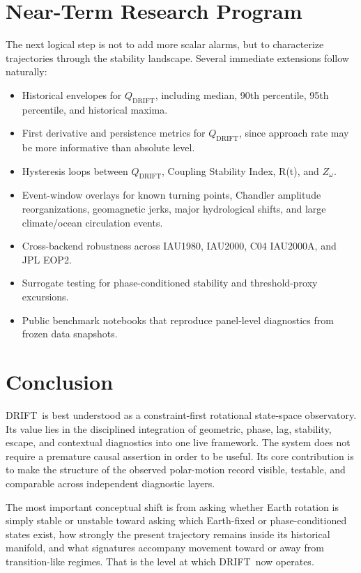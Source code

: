 \documentclass[11pt]{article}
\newcommand{\DRIFT}{\textsc{DRIFT}}
\newcommand{\Rratio}{R(t)}
\newcommand{\Qdrift}{Q_{\mathrm{DRIFT}}}
\newcommand{\Zomega}{Z_{\omega}}
\begin{document}
\section{Near-Term Research Program}
The next logical step is not to add more scalar alarms, but to characterize trajectories through the stability landscape. Several immediate extensions follow naturally:
\begin{itemize}
\item Historical envelopes for \(\Qdrift\), including median, 90th percentile, 95th percentile, and historical maxima.
\item First derivative and persistence metrics for \(\Qdrift\), since approach rate may be more informative than absolute level.
\item Hysteresis loops between \(\Qdrift\), Coupling Stability Index, \Rratio, and \(\Zomega\).
\item Event-window overlays for known turning points, Chandler amplitude reorganizations, geomagnetic jerks, major hydrological shifts, and large climate/ocean circulation events.
\item Cross-backend robustness across IAU1980, IAU2000, C04 IAU2000A, and JPL EOP2.
\item Surrogate testing for phase-conditioned stability and threshold-proxy excursions.
\item Public benchmark notebooks that reproduce panel-level diagnostics from frozen data snapshots.
\end{itemize}

\section{Conclusion}
\DRIFT\ is best understood as a constraint-first rotational state-space observatory. Its value lies in the disciplined integration of geometric, phase, lag, stability, escape, and contextual diagnostics into one live framework. The system does not require a premature causal assertion in order to be useful. Its core contribution is to make the structure of the observed polar-motion record visible, testable, and comparable across independent diagnostic layers.

The most important conceptual shift is from asking whether Earth rotation is simply stable or unstable toward asking which Earth-fixed or phase-conditioned states exist, how strongly the present trajectory remains inside its historical manifold, and what signatures accompany movement toward or away from transition-like regimes. That is the level at which \DRIFT\ now operates.
\end{document}
